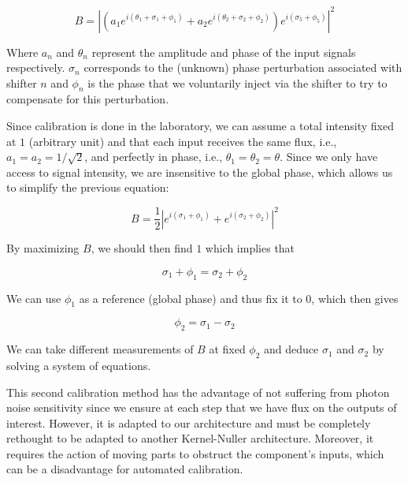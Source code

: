 \documentclass{aa}
\begin{document}
            \begin{equation}
                B = \left|\left(a_1 e^{i(\theta_1 + \sigma_1 + \phi_1)} + a_2 e^{i(\theta_2 + \sigma_2 + \phi_2)}\right) e^{i(\sigma_5 + \phi_5)}\right|^2
            \end{equation}

            Where $a_n$ and $\theta_n$ represent the amplitude and phase of the input signals respectively. $\sigma_n$ corresponds to the (unknown) phase perturbation associated with shifter $n$ and $\phi_n$ is the phase that we voluntarily inject via the shifter to try to compensate for this perturbation.

            Since calibration is done in the laboratory, we can assume a total intensity fixed at $1$ (arbitrary unit) and that each input receives the same flux, i.e., $a_1 = a_2 = 1/\sqrt{2}$, and perfectly in phase, i.e., $\theta_1 = \theta_2 = \theta$. Since we only have access to signal intensity, we are insensitive to the global phase, which allows us to simplify the previous equation:

            \begin{equation}
                B = \frac{1}{2} \left|e^{i(\sigma_1 + \phi_1)} + e^{i(\sigma_2 + \phi_2)}\right|^2
            \end{equation}

            By maximizing $B$, we should then find $1$ which implies that

            \begin{equation}
                \sigma_1 + \phi_1 = \sigma_2 + \phi_2
            \end{equation}

            We can use $\phi_1$ as a reference (global phase) and thus fix it to 0, which then gives

            \begin{equation}
                \phi_2 = \sigma_1 - \sigma_2
            \end{equation}

            We can take different measurements of $B$ at fixed $\phi_2$ and deduce $\sigma_1$ and $\sigma_2$ by solving a system of equations.

            This second calibration method has the advantage of not suffering from photon noise sensitivity since we ensure at each step that we have flux on the outputs of interest. However, it is adapted to our architecture and must be completely rethought to be adapted to another Kernel-Nuller architecture. Moreover, it requires the action of moving parts to obstruct the component's inputs, which can be a disadvantage for automated calibration.
\end{document}
